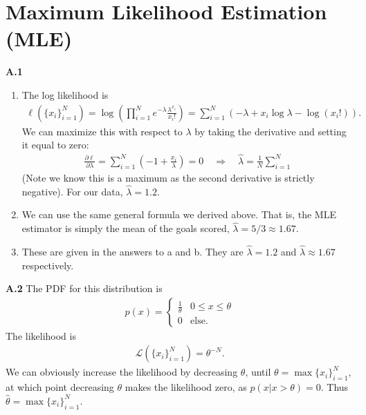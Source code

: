 \documentclass{article}
\begin{document}
\section*{Maximum Likelihood Estimation (MLE)}

\textbf{A.1}
\begin{enumerate}
        \item 
        The log likelihood is
        \begin{align*}
                \ell \left( \{x_i\}_{i=1}^N \right)
                = \log \left( \prod_{i=1}^N e^{-\lambda} \frac{\lambda^{x_i}}{x_i !} \right)
                = \sum_{i=1}^N ( -\lambda + x_i \log \lambda - \log (x_i !) ).
        \end{align*}
        We can maximize this with respect to $\lambda$ by taking the derivative and setting it equal to zero:
        \begin{align*}
                \frac{\partial \ell}{\partial \lambda} = \sum_{i=1}^N \left( -1 + \frac{x_i}{\lambda} \right) = 0
                \quad \Longrightarrow \quad
                \hat{\lambda} = \frac{1}{N} \sum_{i=1}^N
        \end{align*}
        (Note we know this is a maximum as the second derivative is strictly negative).
        For our data, $\hat{\lambda} = 1.2$.

        \item
        We can use the same general formula we derived above.
        That is, the MLE estimator is simply the mean of the goals scored, $\hat{\lambda} = 5/3 \approx 1.67$.

        \item
        These are given in the answers to a and b. 
        They are $\hat{\lambda} = 1.2$ and $\hat{\lambda} \approx 1.67$ respectively.

\end{enumerate}

\textbf{A.2}
The PDF for this distribution is
\begin{align*}
        p(x) = \begin{cases}
                 \frac{1}{\theta} & 0 \leq x \leq \theta \\
                 0 & \text{else}.
        \end{cases}
\end{align*}
The likelihood is
\begin{align*}
        \mathcal{L} \left( \{x_i\}_{i=1}^N \right) = \theta^{-N}.
\end{align*}
We can obviously increase the likelihood by decreasing $\theta$, until $\theta = \max \{x_i\}_{i=1}^N$, at which point decreasing $\theta$ makes the likelihood zero, as $p(x|x>\theta) = 0$.
Thus $\hat{\theta} = \max \{x_i\}_{i=1}^N$.
\end{document}
